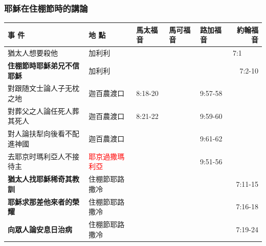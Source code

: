 \subsubsection{耶穌在住棚節時的講論}
\begin{table}[H]\centering 
\begin{tabular}{p{13.07em}|l|l|l|p{5.285em}|r}\toprule
\textbf{事 件} & \multicolumn{1}{p{7.93em}|}{\textbf{地 點}} & \multicolumn{1}{p{5.285em}|}{\textbf{馬太福音}} & \multicolumn{1}{p{5.57em}|}{\textbf{馬可福音}} & \textbf{路加福音} & \multicolumn{1}{p{4.855em}}{\textbf{約翰福音}} \\\midrule 

猶太人想要殺他& \multicolumn{1}{p{7.93em}|}{加利利} & \multicolumn{1}{p{5.285em}|}{} & \multicolumn{1}{p{5.57em}|}{} &  &\multicolumn{1}{l}{7:1}  \\ \midrule

\textbf{住棚節時耶穌弟兄不信耶穌} & \multicolumn{1}{p{7.93em}|}{加利利} &       &       & \multicolumn{1}{r|}{} & \multicolumn{1}{p{4.855em}}{7:2-10} \\\midrule

對跟随文士論人子无枕之地& \multicolumn{1}{p{7.93em}|}{迦百農渡口} & \multicolumn{1}{p{5.285em}|}{8:18-20} &       & 9:57-58&  \\ \midrule

對葬父之人論任死人葬其死人& \multicolumn{1}{p{7.93em}|}{迦百農渡口} & \multicolumn{1}{p{5.285em}|}{8:21-22} &       & 9:59-60&  \\ \midrule

對人論扶犁向後看不配進神國& \multicolumn{1}{p{7.93em}|}{迦百農渡口} & \multicolumn{1}{p{5.285em}|}{} &       & 9:61-62 &  \\ \midrule

去耶京时瑪利亞人不接待主& \multicolumn{1}{p{7.93em}|}{\textcolor{red}{耶京過撒瑪利亞}} &  &  & 9:51-56 &  \\\midrule

\textbf{猶太人找耶穌稀奇其教訓} & \multicolumn{1}{p{7.93em}|}{住棚節耶路撒冷} &       &       & \multicolumn{1}{r|}{} & \multicolumn{1}{p{4.855em}}{7:11-15} \\\midrule

\textbf{耶穌求那差他來者的榮耀} & \multicolumn{1}{p{7.93em}|}{住棚節耶路撒冷} &       &       & \multicolumn{1}{r|}{} & \multicolumn{1}{p{4.855em}}{7:16-18} \\\midrule

\textbf{向眾人論安息日治病} & \multicolumn{1}{p{7.93em}|}{住棚節耶路撒冷} &       &       & \multicolumn{1}{r|}{} & \multicolumn{1}{p{4.855em}}{7:19-24} \\\midrule


\end{tabular}
\end{table}
